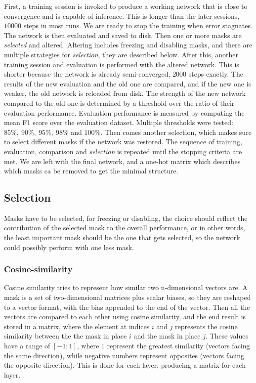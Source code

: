 \documentclass[12pt]{report}
\begin{document}
First, a training session is invoked to produce a working network that is close to convergence and is capable of inference. This is longer than the later sessions, $10000$ steps in most runs. We are ready to stop the training when error stagnates. The network is then evaluated and saved to disk. Then one or more masks are \textit{selected} and altered. Altering includes freezing and disabling masks, and there are multiple strategies for \textit{selection}, they are described below. After this, another training session and evaluation is performed with the altered network. This is shorter because the network is already semi-converged, $2000$ steps exactly. The results of the new evaluation and the old one are compared, and if the new one is weaker, the old network is reloaded from disk. The strength of the new network compared to the old one is determined by a threshold over the ratio of their evaluation performance. Evaluation performance is measured by computing the mean F1 score over the evaluation dataset. Multiple thresholds were tested: $ 85\%,\ 90\%,\ 95\%,\ 98\%$ and $100\%$. Then comes another selection, which makes sure to select different masks if the network was restored. The sequence of training, evaluation, comparison and \textit{selection} is repeated until the stopping criteria are met. We are left with the final network, and a one-hot matrix which describes which masks ca be removed to get the minimal structure.
\subsection{Selection}
Masks have to be selected, for freezing or disabling, the choice should reflect the contribution of the selected mask to the overall performance, or in other words, the least important mask should be the one that gets selected, so the network could possibly perform with one less mask.
\subsubsection{Cosine-similarity}Cosine similarity  tries to represent how similar two n-dimensional vectors are. A mask is a set of two-dimensional matrices plus scalar biases, so they are reshaped to a vector format, with the bias appended to the end of the vector. Then all the vectors are compared to each other using cosine similarity, and the end result is stored in a matrix, where the element at indices $i$ and $j$ represents the cosine similarity between the the mask in place $i$ and the mask in place $j$. These values have a range of $\left[-1;1\right] $, where $1$ represent the greatest similarity (vectors facing the same direction), while negative numbers represent opposites (vectors facing the opposite direction). This is done for each layer, producing a matrix for each layer.
\end{document}
